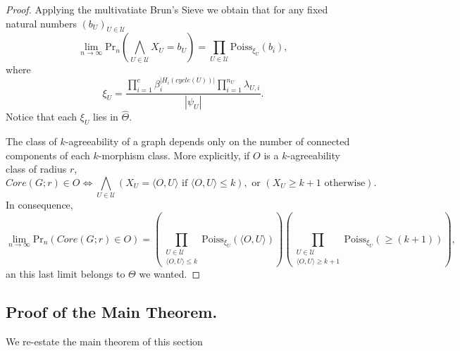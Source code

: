 \documentclass[11pt,notitlepage,a4paper]{article}
\theoremstyle{definition}
\newcommand{\Ln}{\lim\limits_{n\to \infty}}
\begin{document}
\begin{proof}
	Applying the multivatiate Brun's Sieve we obtain that for any fixed  
	natural numbers $(b_U)_{U\in \mathcal{U}}$ 
	\[\Ln \mathrm{Pr}_n\left( \bigwedge_{U\in \mathcal{U}} X_U=b_U  \right)=
	\prod_{U\in \mathcal{U}}\mathrm{Poiss}_{\xi_U}(b_i),
	\]
	where
	\[ \xi_U= \frac{ \prod_{i=1}^c \beta_i^{|H_i(cycle(U))|} \prod_{i=1}^{n_U} \lambda_{U,i}}{|\psi_U|}.\]
	Notice that each $\xi_U$ lies in $\widehat{\Theta}$.
	
	The class of $k$-agreeability of a graph depends only on the number
	of connected components of each $k$-morphism class. More explicitly, 
	if $O$ is a $k$-agreeability class of radius $r$, 
	\[Core(G;r)\in O \iff \bigwedge_{U\in \mathcal{U}} (X_U=\langle O,U \rangle \text{ if }\langle O,U \rangle\leq k), \text{ or }  (X_U\geq k+1 \text{ otherwise}).\]
	In consequence,
	\[ \Ln \mathrm{Pr}_n(Core(G;r)\in O) = \left(\prod_{\substack{U\in \mathcal{U}\\\langle O,U \rangle\leq k}} \mathrm{Poiss}_{\xi_U}(\langle O,U \rangle) \right) \left(\prod_{\substack{U\in \mathcal{U}\\\langle O,U \rangle\geq k+1}}
	\mathrm{Poiss}_{\xi_U}(\geq (k+1)) \right),\]
	an this last limit belongs to $\Theta$ we wanted.   
\end{proof}

\subsection{Proof of the Main Theorem.}
 
We re-estate the main theorem of this section 
\end{document}
